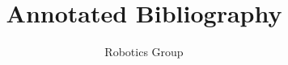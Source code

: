 \documentclass[12pt]{article}
\begin{document}
\title{Annotated Bibliography}
\author{Robotics Group}
\date{}

\maketitle

\nocite{*}


\end{document}
